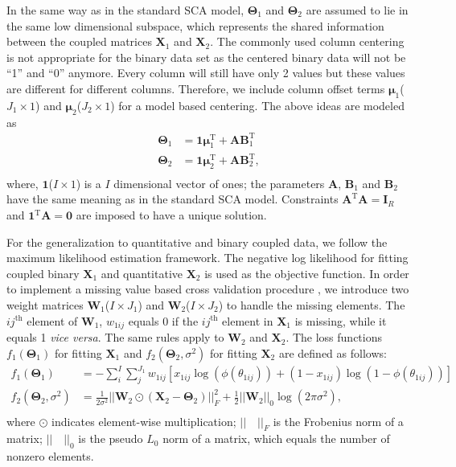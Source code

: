 In the same way as in the standard SCA model, $\mathbf{\Theta}_1$ and $\mathbf{\Theta}_2$ are assumed to lie in the same low dimensional subspace, which represents the shared information between the coupled matrices $\mathbf{X}_1$ and $\mathbf{X}_2$. The commonly used column centering is not appropriate for the binary data set as the centered binary data will not be ``1'' and ``0'' anymore. Every column will still have only 2 values but these values are different for different columns. Therefore, we include column offset terms $\bm{\mu}_1$($J_1 \times 1$) and $\bm{\mu}_2$($J_2 \times 1$) for a model based centering. The above ideas are modeled as
\begin{equation}\label{chapter4_eq:2}
\begin{aligned}
\mathbf{\Theta}_1 &= \mathbf{1}\bm{\mu}_1^{\text{T}} + \mathbf{AB}_1^{\text{T}}\\
\mathbf{\Theta}_2 &= \mathbf{1}\bm{\mu}_2^{\text{T}} + \mathbf{AB}_2^{\text{T}},\\
\end{aligned}
\end{equation}
where, $\mathbf{1}$($I\times 1$) is a $I$ dimensional vector of ones; the parameters $\mathbf{A}$, $\mathbf{B}_1$ and $\mathbf{B}_2$ have the same meaning as in the standard SCA model. Constraints $\mathbf{A}^{\text{T}}\mathbf{A}=\mathbf{I}_R$ and $\mathbf{1}^{\text{T}}\mathbf{A} = \mathbf{0}$ are imposed to have a unique solution.

For the generalization to quantitative and binary coupled data, we follow the maximum likelihood estimation framework. The negative log likelihood for fitting coupled binary $\mathbf{X}_1$ and quantitative $\mathbf{X}_2$ is used as the objective function. In order to implement a missing value based cross validation procedure \cite{bro2008cross}, we introduce two weight matrices $\mathbf{W}_1$($I\times J_1$) and $\mathbf{W}_2$($I\times J_2$) to handle the missing elements. The $ij^{\text{th}}$ element of $\mathbf{W}_1$, $w_{1ij}$ equals 0 if the $ij^{\text{th}}$ element in $\mathbf{X}_1$ is missing, while it equals 1 \textit{vice versa}. The same rules apply to $\mathbf{W}_2$ and $\mathbf{X}_2$. The loss functions $f_1(\mathbf{\Theta}_1)$ for fitting $\mathbf{X}_1$ and $f_2(\mathbf{\Theta}_2,\sigma^2)$ for fitting $\mathbf{X}_2$ are defined as follows:
\begin{equation}\label{chapter4_eq:3}
\begin{aligned}
f_1(\mathbf{\Theta}_1) &= -\sum_{i}^{I}\sum_{j}^{J_1} w_{1ij} \left[x_{1ij}\log(\phi(\theta_{1ij})) + (1-x_{1ij})\log(1-\phi(\theta_{1ij}))\right] \\
f_2(\mathbf{\Theta}_2,\sigma^2)  &= \frac{1}{2\sigma^2}
              ||\mathbf{W}_2 \odot (\mathbf{X}_2-\mathbf{\Theta}_2)||_F^2 +     \frac{1}{2} ||\mathbf{W}_2||_0 \log(2\pi \sigma^2),\\
\end{aligned}
\end{equation}
where $\odot$ indicates element-wise multiplication; $||\quad||_F$ is the Frobenius norm of a matrix; $||\quad||_0$ is the pseudo $L_0$ norm of a matrix, which equals the number of nonzero elements.

